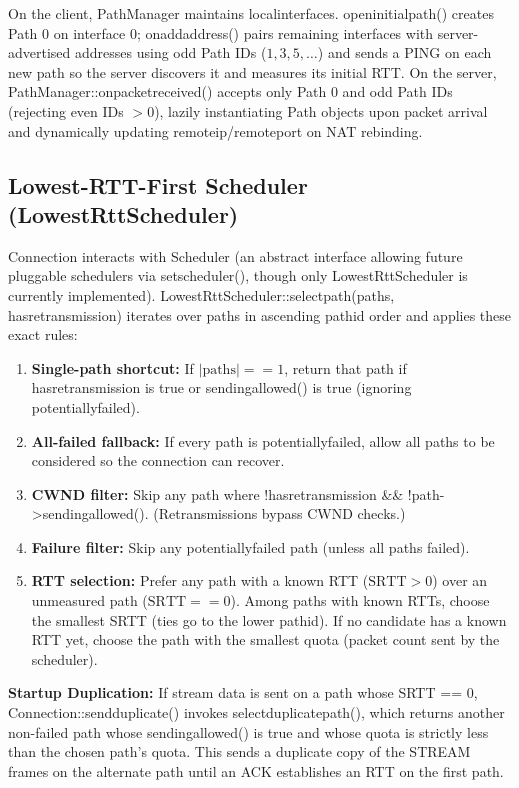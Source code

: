 \documentclass[10pt,a4paper]{article}
\newcommand{\codeul}{\textunderscore\hspace{0pt}}
\DeclareRobustCommand{\code}[1]{{\ttfamily\let\_\codeul #1}}
\begin{document}
On the client, \code{PathManager} maintains \code{local\_interfaces}. \code{open\_initial\_path()} creates Path 0 on interface 0; \code{on\_add\_address()} pairs remaining interfaces with server-advertised addresses using odd Path IDs ($1, 3, 5, \dots$) and sends a \code{PING} on each new path so the server discovers it and measures its initial RTT. On the server, \code{PathManager::on\_packet\_received()} accepts only Path 0 and odd Path IDs (rejecting even IDs $> 0$), lazily instantiating \code{Path} objects upon packet arrival and dynamically updating \code{remote\_ip}/\code{remote\_port} on NAT rebinding.

\subsection{Lowest-RTT-First Scheduler (\code{LowestRttScheduler})}
\code{Connection} interacts with \code{Scheduler} (an abstract interface allowing future pluggable schedulers via \code{set\_scheduler()}, though only \code{LowestRttScheduler} is currently implemented). \code{LowestRttScheduler::select\_path(paths, has\_retransmission)} iterates over \code{paths} in ascending \code{path\_id} order and applies these exact rules:
\begin{enumerate}
    \item \textbf{Single-path shortcut:} If $|\text{paths}| == 1$, return that path if \code{has\_retransmission} is true or \code{sending\_allowed()} is true (ignoring \code{potentially\_failed}).
    \item \textbf{All-failed fallback:} If every path is \code{potentially\_failed}, allow all paths to be considered so the connection can recover.
    \item \textbf{CWND filter:} Skip any path where \code{!has\_retransmission \&\& !path->sending\_allowed()}. (Retransmissions bypass CWND checks.)
    \item \textbf{Failure filter:} Skip any \code{potentially\_failed} path (unless all paths failed).
    \item \textbf{RTT selection:} Prefer any path with a known RTT ($\text{SRTT} > 0$) over an unmeasured path ($\text{SRTT} == 0$). Among paths with known RTTs, choose the smallest \code{SRTT} (ties go to the lower \code{path\_id}). If no candidate has a known RTT yet, choose the path with the smallest \code{quota} (packet count sent by the scheduler).
\end{enumerate}

\textbf{Startup Duplication:} If stream data is sent on a path whose \code{SRTT == 0}, \code{Connection::send\_duplicate()} invokes \code{select\_duplicate\_path()}, which returns another non-failed path whose \code{sending\_allowed()} is true and whose \code{quota} is strictly less than the chosen path's \code{quota}. This sends a duplicate copy of the \code{STREAM} frames on the alternate path until an ACK establishes an RTT on the first path.
\end{document}
